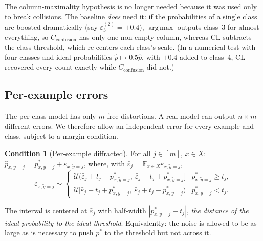 \documentclass[11pt,a4paper]{report}
\newcommand{\Cconf}{C_{\text{confusion}}}
\newcommand{\E}{\mathbb{E}}
\newcommand{\argmax}{\operatorname*{arg\,max}}
\newcommand{\1}{\mathbf 1}
\newcommand{\eps}{\varepsilon}
\theoremstyle{definition}
\newtheorem{condition}[definition]{Condition}
\theoremstyle{plain}
\theoremstyle{remark}
\begin{document}
\begin{intuition}
The column-maximality hypothesis is no longer needed because it was used only to break collisions. The baseline \emph{does} need it: if the probabilities of a single class are boosted dramatically (say $\eps^{(2)}_3=+0.4$), $\argmax$ outputs class~3 for almost everything, so $\Cconf$ has only one non-empty column, whereas CL subtracts the class threshold, which re-centers each class's scale. (In a numerical test with four classes and ideal probabilities $\hat p\mapsto0.5\hat p$, with $+0.4$ added to class~4, CL recovered every count exactly while $\Cconf$ did not.)
\end{intuition}

\subsection{Per-example errors}
The per-class model has only $m$ free distortions. A real model can output $n\times m$ different errors. We therefore allow an independent error for every example and class, subject to a margin condition.

\begin{condition}[Per-example diffracted]\label{cond:perex}
For all $j\in[m]$, $x\in X$: $\hat p_{x,\tilde y=j}=p^*_{x,\tilde y=j}+\eps_{x,\tilde y=j}$, where, with $\bar\eps_j=\E_{x\in X}\eps_{x,\tilde y=j}$,
\begin{equation}\label{eq:perex}
\eps_{x,\tilde y=j}\sim\begin{cases}
\mathcal U\bigl(\bar\eps_j+t_j-p^*_{x,\tilde y=j},\ \bar\eps_j-t_j+p^*_{x,\tilde y=j}\bigr] & p^*_{x,\tilde y=j}\ge t_j,\\[3pt]
\mathcal U\bigl[\bar\eps_j-t_j+p^*_{x,\tilde y=j},\ \bar\eps_j+t_j-p^*_{x,\tilde y=j}\bigr) & p^*_{x,\tilde y=j}< t_j.
\end{cases}
\end{equation}
\end{condition}
The interval is centered at $\bar\eps_j$ with half-width $|p^*_{x,\tilde y=j}-t_j|$, \emph{the distance of the ideal probability to the ideal threshold}. Equivalently: the noise is allowed to be as large as is necessary to push $p^*$ to the threshold but not across it.
\end{document}
